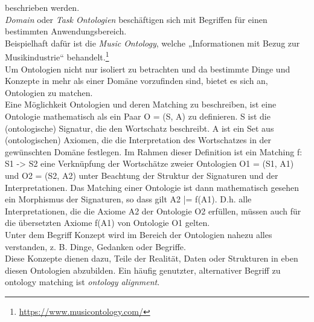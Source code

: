 beschrieben werden.\\
\textit{Domain} oder \textit{Task Ontologien} beschäftigen sich mit Begriffen
für einen bestimmten Anwendungsbereich. \cite{Bie02}  \cite{Hes02}\\
Beispielhaft dafür ist die \textit{Music Ontology}, welche „Informationen mit
Bezug zur Musikindustrie“
behandelt.\footnote{\url{https://www.musicontology.com/}}\\
Um Ontologien nicht nur isoliert zu betrachten und da bestimmte Dinge und
Konzepte in mehr als einer Domäne vorzufinden sind, bietet es sich an,
Ontologien zu matchen.\\
Eine Möglichkeit Ontologien und deren Matching zu beschreiben, ist eine
Ontologie mathematisch als ein Paar O = (S, A) zu
definieren. S ist die (ontologische) Signatur, die den Wortschatz
beschreibt. A ist ein Set aus (ontologischen) Axiomen, die die Interpretation
des Wortschatzes in der gewünschten Domäne festlegen. Im Rahmen dieser Definition
ist ein Matching f: S1 -> S2 eine Verknüpfung der Wortschätze
zweier Ontologien O1 = (S1, A1) und O2 = (S2, A2)  unter Beachtung der Struktur
der Signaturen und der Interpretationen. Das Matching einer Ontologie ist dann
mathematisch gesehen ein Morphismus der Signaturen, so dass gilt A2 |= f(A1).
D.h. alle Interpretationen, die die Axiome A2 der Ontologie O2 erfüllen, müssen
auch für die übersetzten Axiome f(A1) von Ontologie O1 gelten. \cite{Hoo14}\\
Unter dem Begriff Konzept wird im Bereich der Ontologien nahezu alles
verstanden, z. B. Dinge, Gedanken oder Begriffe. \cite{Usc95}\\
Diese Konzepte
dienen dazu, Teile der Realität, Daten oder Strukturen in eben diesen Ontologien
abzubilden. Ein häufig genutzter, alternativer Begriff zu ontology
matching ist \textit{ontology alignment}.

